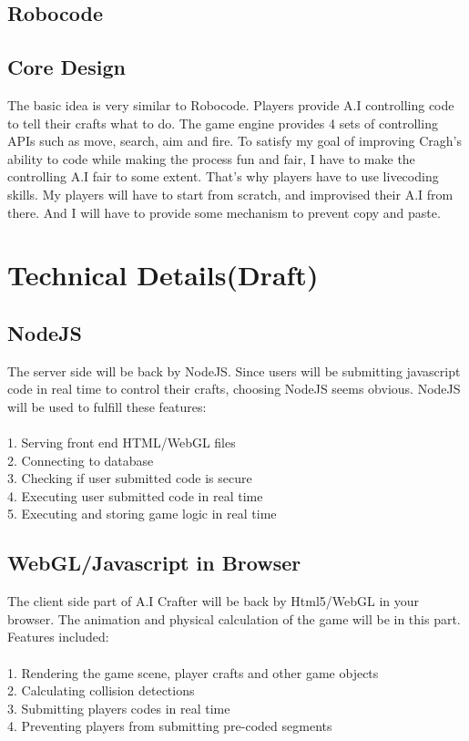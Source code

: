 \documentclass[12pt]{article}
\begin{document}
\subsection{Robocode}

\subsection{Core Design}
The basic idea is very similar to Robocode. Players provide A.I controlling code to tell their crafts what to do. The game engine provides 4 sets of controlling APIs such as move, search, aim and fire.
To satisfy my goal of improving Cragh's ability to code while making the process fun and fair, I have to make the controlling A.I fair to some extent.
That's why players have to use livecoding skills.  My players will have to start from scratch, and improvised their A.I from there. And I will have to provide some mechanism to prevent copy and paste.

\section{Technical Details(Draft)}

\subsection{NodeJS}
The server side will be back by NodeJS. Since users will be submitting javascript code in real time to control their crafts, choosing NodeJS seems obvious. NodeJS will be used to fulfill these features:\\
\\
1. Serving front end HTML/WebGL files\\
2. Connecting to database\\
3. Checking if user submitted code is secure\\
4. Executing user submitted code in real time\\
5. Executing and storing game logic in real time\\

\subsection{WebGL/Javascript in Browser}
The client side part of A.I Crafter will be back by Html5/WebGL in your browser.
The animation and physical calculation of the game will be in this part. Features included:\\
\\
1. Rendering the game scene, player crafts and other game objects\\
2. Calculating collision detections\\
3. Submitting players codes in real time\\
4. Preventing players from submitting pre-coded segments\\
\end{document}
